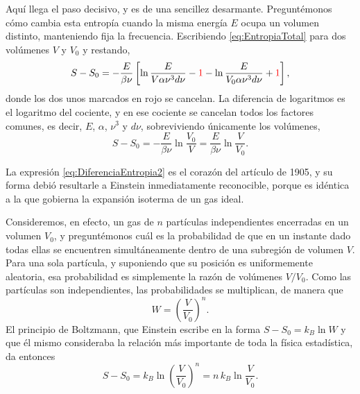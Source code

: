             Aquí llega el paso decisivo, y es de una sencillez desarmante. Preguntémonos cómo cambia esta entropía cuando la misma energía $E$ ocupa un volumen distinto, manteniendo fija la frecuencia. Escribiendo \eqref{eq:EntropiaTotal} para dos volúmenes $V$ y $V_{0}$ y restando,
            \begin{equation}\label{eq:DiferenciaEntropia1}
                S - S_{0} = -\frac{E}{\beta\nu}\left[\ln\frac{E}{V\alpha\nu^{3}d\nu} - \textcolor{red}{1} - \ln\frac{E}{V_{0}\alpha\nu^{3}d\nu} + \textcolor{red}{1}\right],
            \end{equation}
            donde los dos unos marcados en rojo se cancelan. La diferencia de logaritmos es el logaritmo del cociente, y en ese cociente se cancelan todos los factores comunes, es decir, $E$, $\alpha$, $\nu^{3}$ y $d\nu$, sobreviviendo únicamente los volúmenes,
            \begin{equation}\label{eq:DiferenciaEntropia2}
                S - S_{0} = -\frac{E}{\beta\nu}\ln\frac{V_{0}}{V} = \frac{E}{\beta\nu}\ln\frac{V}{V_{0}} .
            \end{equation}

            La expresión \eqref{eq:DiferenciaEntropia2} es el corazón del artículo de 1905, y su forma debió resultarle a Einstein inmediatamente reconocible, porque es idéntica a la que gobierna la expansión isoterma de un gas ideal.

            Consideremos, en efecto, un gas de $n$ partículas independientes encerradas en un volumen $V_{0}$, y preguntémonos cuál es la probabilidad de que en un instante dado todas ellas se encuentren simultáneamente dentro de una subregión de volumen $V$. Para una sola partícula, y suponiendo que su posición es uniformemente aleatoria, esa probabilidad es simplemente la razón de volúmenes $V/V_{0}$. Como las partículas son independientes, las probabilidades se multiplican, de manera que
            \begin{equation}\label{eq:ProbabilidadGas}
                W = \left(\frac{V}{V_{0}}\right)^{n} .
            \end{equation}
            El principio de Boltzmann, que Einstein escribe en la forma $S - S_{0} = k_{B}\ln W$ y que él mismo consideraba la relación más importante de toda la física estadística, da entonces
            \begin{equation}\label{eq:BoltzmannGas}
                S - S_{0} = k_{B}\ln\left(\frac{V}{V_{0}}\right)^{n} = n\,k_{B}\ln\frac{V}{V_{0}} .
            \end{equation}

